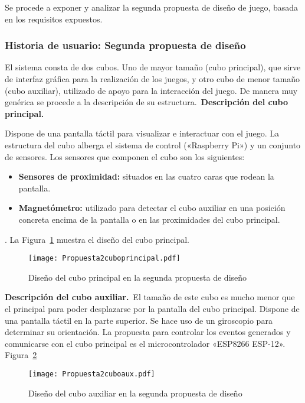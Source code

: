 Se procede a exponer y analizar la segunda propuesta de diseño de juego, basada en los requisitos expuestos.

\subsubsection{Historia de usuario: Segunda propuesta de diseño}

El sistema consta de dos cubos. Uno de mayor tamaño (cubo principal), que sirve de interfaz gráfica para la realización de los juegos, y otro cubo de menor tamaño (cubo auxiliar), utilizado de apoyo para la interacción del juego. De manera muy genérica se procede a la descripción de su estructura.\
\textbf{Descripción del cubo principal.}\

Dispone de una pantalla táctil para visualizar e interactuar con el juego. La estructura del cubo alberga el sistema de control («Raspberry Pi») y un conjunto de sensores. Los sensores que componen el cubo son los siguientes:
\begin{itemize}
\item \textbf{Sensores de proximidad:} situados en las cuatro caras que rodean la pantalla.
\item \textbf{Magnetómetro:} utilizado para detectar el cubo auxiliar en una posición concreta encima de la pantalla o en las proximidades del cubo principal.
\end{itemize}. La Figura~\ref{fig:Propuesta2cuboprincipal} muestra el diseño del cubo principal.\

\begin{figure}[!h]
\begin{center}
\texttt{[image: Propuesta2cuboprincipal.pdf]}
\caption{Diseño del cubo principal en la segunda propuesta de diseño}
\label{fig:Propuesta2cuboprincipal}
\end{center}
\end{figure}

\textbf{Descripción del cubo auxiliar.}\
El tamaño de este cubo es mucho menor que el principal para poder desplazarse por la pantalla del cubo principal. Dispone de una pantalla táctil en la parte superior.
Se hace uso de un giroscopio para determinar su orientación.
La propuesta para controlar los eventos generados y comunicarse con el cubo principal es el microcontrolador «ESP8266 ESP-12». Figura~\ref{fig:Propuesta2cuboaux}\

\begin{figure}[!h]
\begin{center}
\texttt{[image: Propuesta2cuboaux.pdf]}
\caption{Diseño del cubo auxiliar en la segunda propuesta de diseño}
\label{fig:Propuesta2cuboaux}
\end{center}
\end{figure}


